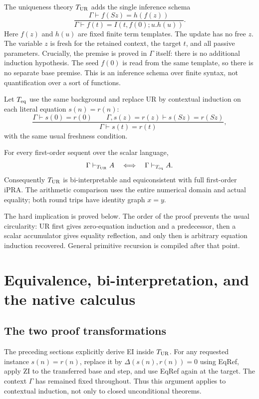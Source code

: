 The uniqueness theory $T_{\rm UR}$ adds the single inference schema
\[
 \boxed{\qquad
 \frac{\Gamma\vdash f(Sz)=h(f(z))}
      {\Gamma\vdash f(t)=I(t,f(0);u.h(u))}.
 \qquad}                                                \tag{UR}
\]
Here $f(z)$ and $h(u)$ are fixed finite term templates.  The update has
no free $z$.  The variable $z$ is fresh for the retained context,
the target $t$, and all passive parameters.  Crucially, the premise is
proved in $\Gamma$ itself: there is no additional induction hypothesis.
The seed $f(0)$ is read from the same template, so there is no separate
base premise.  This is an inference schema over finite syntax, not
quantification over a sort of functions.

Let $T_{\rm eq}$ use the same background and replace UR by contextual
induction on each literal equation $s(n)=r(n)$:
\[
 \frac{\Gamma\vdash s(0)=r(0)\qquad
       \Gamma,s(z)=r(z)\vdash s(Sz)=r(Sz)}
      {\Gamma\vdash s(t)=r(t)},                         \tag{EI}
\]
with the same usual freshness condition.

\begin{theorem}
For every first-order sequent over the scalar language,
\[
                  \Gamma\vdash_{T_{\rm UR}} A
       \quad\Longleftrightarrow\quad
                  \Gamma\vdash_{T_{\rm eq}} A.
\]
Consequently $T_{\rm UR}$ is bi-interpretable and equiconsistent with full
first-order iPRA.  The arithmetic comparison uses the entire numerical
domain and actual equality; both round trips have identity graph $x=y$.
\end{theorem}

The hard implication is proved below.  The order of the proof prevents
the usual circularity: UR first gives zero-equation induction and a
predecessor, then a scalar accumulator gives equality reflection, and
only then is arbitrary equation induction recovered.  General
primitive recursion is compiled after that point.





\section{Equivalence, bi-interpretation, and the native calculus}
\label{sec:ur-equivalence-finish}

\subsection{The two proof transformations}
The preceding sections explicitly derive EI inside $T_{\rm UR}$.
For any requested instance $s(n)=r(n)$, replace it by
$\Delta(s(n),r(n))=0$ using EqRef, apply ZI to the transferred base
and step, and use EqRef again at the target.  The context $\Gamma$
has remained fixed throughout.  Thus this argument applies to
contextual induction, not only to closed unconditional theorems.

